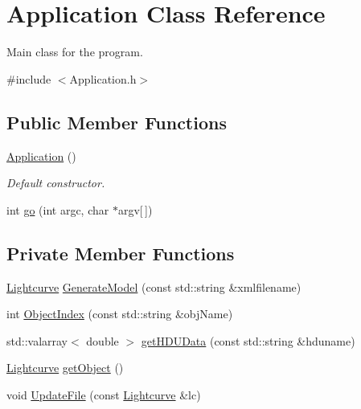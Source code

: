 \hypertarget{classApplication}{
\section{Application Class Reference}
\label{classApplication}
}


Main class for the program.  




{\ttfamily \#include $<$Application.h$>$}

\subsection*{Public Member Functions}
\begin{DoxyCompactItemize}
\item 
\hyperlink{classApplication_afa8cc05ce6b6092be5ecdfdae44e05f8}{Application} ()
\begin{DoxyCompactList}\small\item\em Default constructor. \item\end{DoxyCompactList}\item 
int \hyperlink{classApplication_a317a13efcc06c55837ece16f52c78f69}{go} (int argc, char $\ast$argv\mbox{[}$\,$\mbox{]})
\end{DoxyCompactItemize}
\subsection*{Private Member Functions}
\begin{DoxyCompactItemize}
\item 
\hyperlink{classLightcurve}{Lightcurve} \hyperlink{classApplication_a3f8c3e34b44ab8382753e0e74ad29cd5}{GenerateModel} (const std::string \&xmlfilename)
\item 
int \hyperlink{classApplication_a73570619a07e02c19088666e67ec03ba}{ObjectIndex} (const std::string \&objName)
\item 
std::valarray$<$ double $>$ \hyperlink{classApplication_ab35e8782e640d1136490e5bc2e7694fb}{getHDUData} (const std::string \&hduname)
\item 
\hyperlink{classLightcurve}{Lightcurve} \hyperlink{classApplication_ace1ec086fdd243abe30a5b5c03d5fcdd}{getObject} ()
\item 
void \hyperlink{classApplication_a8d5d693822ae75b81c0cfefe4d9efaa8}{UpdateFile} (const \hyperlink{classLightcurve}{Lightcurve} \&lc)
\end{DoxyCompactItemize}
